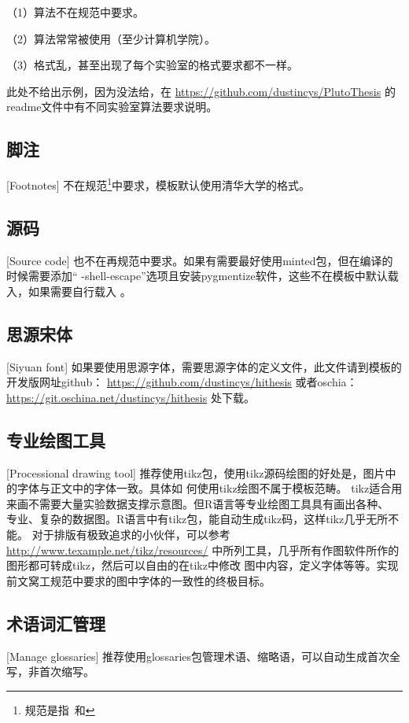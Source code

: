 （1）算法不在规范中要求。

（2）算法常常被使用（至少计算机学院）。

（3）格式乱，甚至出现了每个实验室的格式要求都不一样。

此处不给出示例，因为没法给，在
\href{https://github.com/dustincys/PlutoThesis}{https://github.com/dustincys/PlutoThesis}
的readme文件中有不同实验室算法要求说明。

\subsection{脚注}[Footnotes]
不在规范\footnote{规范是指\PGR\ 和\UGR}中要求，模板默认使用清华大学的格式。

\subsection{源码}[Source code]
也不在再规范中要求。如果有需要最好使用minted包，但在编译的时候需要添加“
-shell-escape”选项且安装pygmentize软件，这些不在模板中默认载入，如果需要自行载入
。
\subsection{思源宋体}[Siyuan font]
如果要使用思源字体，需要思源字体的定义文件，此文件请到模板的开发版网址github：
\href{https://github.com/dustincys/hithesis}{https://github.com/dustincys/hithesis}
或者oschia：
\href{https://git.oschina.net/dustincys/hithesis}{https://git.oschina.net/dustincys/hithesis}
处下载。

\subsection{专业绘图工具}[Processional drawing tool]
\label{drawtool}
推荐使用tikz包，使用tikz源码绘图的好处是，图片中的字体与正文中的字体一致。具体如
何使用tikz绘图不属于模板范畴。
tikz适合用来画不需要大量实验数据支撑示意图。但R语言等专业绘图工具具有画出各种、
专业、复杂的数据图。R语言中有tikz包，能自动生成tikz码，这样tikz几乎无所不能。
对于排版有极致追求的小伙伴，可以参考
\href{http://www.texample.net/tikz/resources/}{http://www.texample.net/tikz/resources/}
中所列工具，几乎所有作图软件所作的图形都可转成tikz，然后可以自由的在tikz中修改
图中内容，定义字体等等。实现前文窝工规范中要求的图中字体的一致性的终极目标。


\subsection{术语词汇管理}[Manage glossaries]
推荐使用glossaries包管理术语、缩略语，可以自动生成首次全写，非首次缩写。

